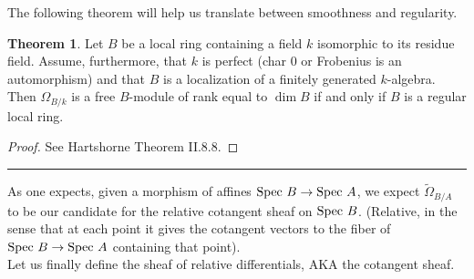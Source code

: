 \documentclass[10pt,reqno]{amsart}
\theoremstyle{definition}
\newtheorem{theorem}{Theorem}
\newtheorem{proposition}[theorem]{Proposition}
\newtheorem{remark}[theorem]{Remark}
\theoremstyle{remark}
\numberwithin{equation}{section}
\numberwithin{theorem}{section}
\newcommand{\spec}{\textup{Spec }}
\newcommand{\wt}{\widetilde}
\begin{document}
The following theorem will help us translate between smoothness and regularity.

\begin{theorem} Let $B$ be a local ring containing a field $k$ isomorphic to its residue field. Assume, furthermore, that $k$ is perfect (char 0 or Frobenius is an automorphism) and that $B$ is a localization of a finitely generated $k$-algebra. Then $\Omega_{B/k}$ is a free $B$-module of rank equal to $\dim B$ if and only if $B$ is a regular local ring.
\end{theorem}
\begin{proof}
See Hartshorne Theorem II.8.8.
\end{proof}



\hrule 
\vspace{1em}

As one expects, given a morphism of affines $\spec B \to \spec A$, we expect $\wt{\Omega}_{B/A}$ to be our candidate for the relative cotangent sheaf on $\spec B$. (Relative, in the sense that at each point it gives the cotangent vectors to the fiber of $\spec B \to \spec A$ containing that point).
\\

Let us finally define the sheaf of relative differentials, AKA the cotangent sheaf.
\\
\end{document}

